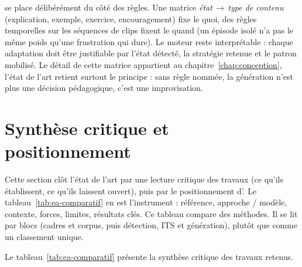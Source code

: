 \emolearn{} se place délibérément du côté des règles. Une matrice
\emph{état\,$\rightarrow$\,type de contenu} (explication, exemple,
exercice, encouragement) fixe le quoi, des règles temporelles sur
les séquences de clips fixent le quand (un épisode isolé n'a pas le
même poids qu'une frustration qui dure). Le moteur reste interprétable :
chaque adaptation doit être justifiable par l'état détecté, la stratégie
retenue et le patron mobilisé. Le détail de cette matrice appartient au
chapitre~\ref{chap:conception}, l'état de l'art retient surtout le
principe : sans règle nommée, la génération n'est plus une décision
pédagogique, c'est une improvisation.

\section{Synthèse critique et positionnement}
\label{sec:ea-synthese}

Cette section clôt l'état de l'art par une lecture critique des
travaux (ce qu'ils établissent, ce qu'ils laissent ouvert), puis par le
positionnement d'\emolearn{}. Le tableau~\ref{tab:ea-comparatif} en
est l'instrument : référence, approche / modèle, contexte, forces, limites,
résultats clés. Ce tableau compare des méthodes. Il se lit
par blocs (cadres et corpus, puis détection, ITS et génération), plutôt
que comme un classement unique.

\providecommand{\eatabhead}{}
\renewcommand{\eatabhead}{%
\rowcolor{gray!20}
\textbf{Référence} & \textbf{Approche / modèle} & \textbf{Contexte} &
\textbf{Forces} & Limites & Résultats clés \\}

Le tableau~\ref{tab:ea-comparatif} présente la synthèse critique des travaux retenus.

